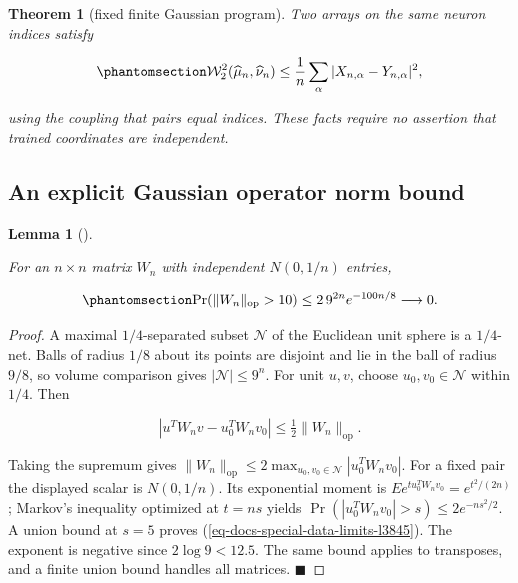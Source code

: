 \documentclass[
  11pt,
]{article}
\theoremstyle{definition}
\theoremstyle{plain}
\newtheorem{theorem}{Theorem}[section]
\theoremstyle{plain}
\theoremstyle{plain}
\newtheorem{lemma}{Lemma}[section]
\theoremstyle{remark}
\begin{document}
\begin{theorem}[fixed finite Gaussian
program]
Two arrays on the same neuron indices satisfy

\begin{equation}\protect\phantomsection\label{eq-docs-special-data-limits-l3835}{
\mathcal W_2^2(\widehat\mu_n,\widehat\nu_n)
\le\frac1n\sum_\alpha |X_{n,\alpha}-Y_{n,\alpha}|^2,
}\end{equation}

using the coupling that pairs equal indices. These facts require no
assertion that trained coordinates are independent.

\end{theorem}

\subsection{An explicit Gaussian operator norm
bound}\label{sec-docs-special-data-limits-l3842}

\begin{lemma}[]\protect\hypertarget{lem-docs-special-data-limits-l3844}{}\label{lem-docs-special-data-limits-l3844}

For an \(n\times n\) matrix \(W_n\) with independent \(N(0,1/n)\)
entries,

\begin{equation}\protect\phantomsection\label{eq-docs-special-data-limits-l3845}{
\Pr(\|W_n\|_{\mathrm{op}}>10)
\le 2\,9^{2n}e^{-100n/8}\longrightarrow0.
}\end{equation}

\end{lemma}

\protect{}\label{proof-docs-special-data-limits-l3851}{}

\begin{proof}
A maximal \(1/4\)-separated subset \(\mathcal N\) of the Euclidean unit
sphere is a \(1/4\)-net. Balls of radius \(1/8\) about its points are
disjoint and lie in the ball of radius \(9/8\), so volume comparison
gives \(|\mathcal N|\le9^n\). For unit \(u,v\), choose
\(u_0,v_0\in\mathcal N\) within \(1/4\). Then

\[
|u^TW_nv-u_0^TW_nv_0|
\le\tfrac12\|W_n\|_{\mathrm{op}}.
\]

Taking the supremum gives
\(\|W_n\|_{\mathrm{op}}\le2\max_{u_0,v_0\in\mathcal N}|u_0^TW_nv_0|\).
For a fixed pair the displayed scalar is \(N(0,1/n)\). Its exponential
moment is \(Ee^{t u_0^TW_nv_0}=e^{t^2/(2n)}\); Markov's inequality
optimized at \(t=ns\) yields \(\Pr(|u_0^TW_nv_0|>s)\le2e^{-ns^2/2}\). A
union bound at \(s=5\) proves (\ref{eq-docs-special-data-limits-l3845}).
The exponent is negative since \(2\log9<12.5\). The same bound applies
to transposes, and a finite union bound handles all matrices.
\(\blacksquare\)
\end{proof}
\end{document}
